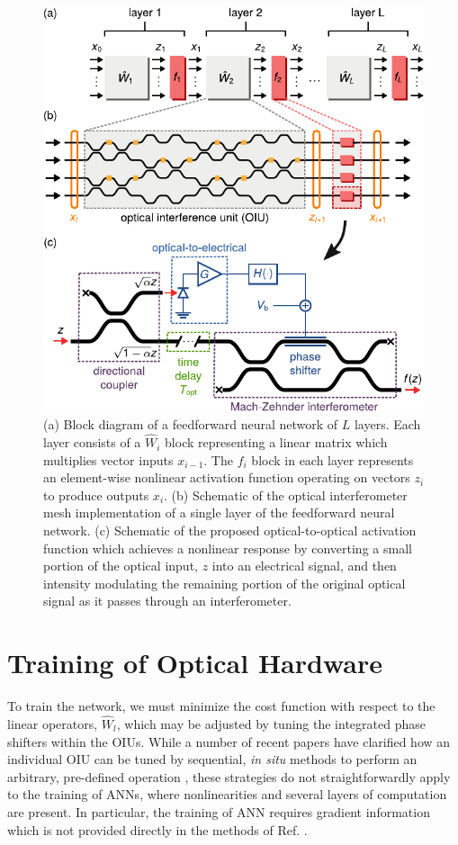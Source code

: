 \begin{figure}
  \centering
  \includegraphics{figures/insitu_activation}
  \caption{(a) Block diagram of a feedforward neural network of $L$ layers. 
  Each layer consists of a $\hat{W}_i$ block representing a linear matrix which multiplies vector inputs $x_{i-1}$. 
  The $f_i$ block in each layer represents an element-wise nonlinear activation function operating on vectors $z_i$ to produce outputs $x_{i}$.
  (b) Schematic of the optical interferometer mesh implementation of a single layer of the feedforward neural network. 
  (c) Schematic of the proposed optical-to-optical activation function which achieves a nonlinear response by converting a small portion of the optical input, $z$ into an electrical signal, and then intensity modulating the remaining portion of the original optical signal as it passes through an interferometer.}
  \label{fig:overview}
\end{figure}

\section{Training of Optical Hardware}

To train the network, we must minimize the cost function with respect to the linear operators, $\hat{W}_l$, which may be adjusted by tuning the integrated phase shifters within the OIUs.  While a number of recent papers have clarified how an individual OIU can be tuned by sequential,  \textit{in situ} methods to perform an arbitrary, pre-defined operation \cite{miller_selfconfiguring_2013, Miller2013a, Miller2015, Annoni2017}, these strategies do not straightforwardly apply to the training of ANNs, where nonlinearities and several layers of computation are present.  In particular, the training of ANN requires gradient information which is not provided directly in the methods of Ref. \cite{miller_selfconfiguring_2013, Miller2013a, Miller2015, Annoni2017}.

